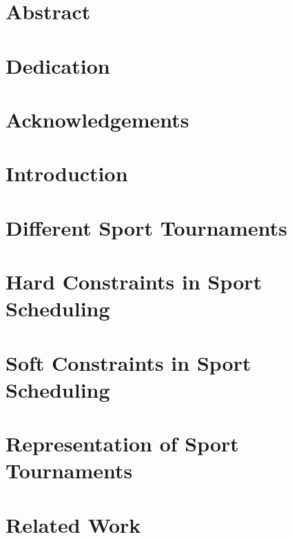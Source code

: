 \documentclass[12pt]{report}
\begin{document}



\chapter*{Abstract}
\chapter*{Dedication}
\chapter*{Acknowledgements}

\tableofcontents

\chapter{Introduction}


\chapter{Different Sport Tournaments}


\chapter{Hard Constraints in Sport Scheduling}


\chapter{Soft Constraints in Sport Scheduling}


\chapter{Representation of Sport Tournaments}


\chapter{Related Work}

\end{document}
